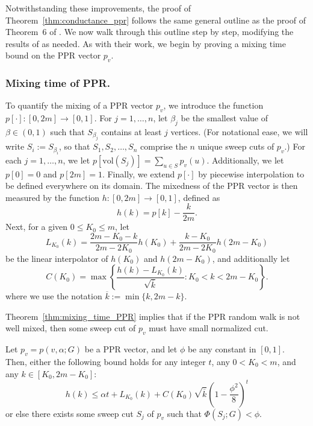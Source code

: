 \documentclass[11pt,twoside]{article}
\newcommand{\set}[1]{\left\{#1\right\}}
\newcommand{\vol}{\mathrm{vol}}
\newcommand{\1}{\mathbbm{1}}
\begin{document}
Notwithstanding these improvements, the proof of Theorem~\ref{thm:conductance_ppr} follows the same general outline as the proof of Theorem~6 of \citet{andersen2006}. We now walk through this outline step by step, modifying the results of \citet{andersen2006} as needed. As with their work, we begin by proving a mixing time bound on the PPR vector $p_v$.

\subsubsection{Mixing time of PPR.}

To quantify the mixing of a PPR vector $p_v$, we introduce the function $p[\cdot]: [0,2m] \to [0,1]$. For $j = 1,\ldots,n$, let $\beta_j$ be the smallest value of $\beta \in (0,1)$ such that $S_{\beta_j}$ contains at least $j$ vertices. (For notational ease, we will write $S_{i} := S_{\beta_i}$, so that $S_1,S_2,\ldots,S_n$ comprise the $n$ unique sweep cuts of $p_v$.)
For each $j = 1,\ldots,n$, we let $p[\vol(S_j)] =  \sum_{u \in S} p_v(u)$. Additionally, we let $p[0] = 0$ and $p[2m] = 1$. Finally, we extend $p[\cdot]$  by piecewise interpolation to be defined everywhere on its domain. The mixedness of the PPR vector is then measured by the function $h:[0,2m] \to [0,1]$, defined as 
\begin{equation*}
h(k) = p[k] - \frac{k}{2m}.
\end{equation*}
Next, for a given $0 \leq K_0 \leq m$, let 
\begin{equation*}
L_{K_0}(k) = \frac{2m - K_0 - k}{2m - 2K_0}h(K_0) + \frac{k - K_0}{2m - 2K_0}h(2m - K_0)
\end{equation*}
be the linear interpolator of $h(K_0)$ and $h(2m - K_0)$, and additionally let
\begin{equation*}
C(K_0) = \max\set{\frac{h(k) - L_{K_0}(k)}{\sqrt{\overline{k}}}: K_0 < k < 2m - K_0}.
\end{equation*}
where we use the notation $\overline{k} := \min\{k, 2m - k\}$.

Theorem~\ref{thm:mixing_time_PPR} implies that if the PPR random walk is not well mixed, then some sweep cut of $p_v$ must have small normalized cut.
\begin{theorem}
	\label{thm:mixing_time_PPR}
	Let $p_v = p(v,\alpha;G)$ be a PPR vector, and let $\phi$ be any constant in $[0,1]$. Then, either the following bound holds for any integer $t$, any $0 < K_0 < m$, and any $k \in [K_0,2m - K_0]$:
	\begin{equation}
	\label{eqn:mixing_time_PPR}
	h(k) \leq \alpha t + L_{K_0}(k) + C(K_0)\sqrt{\overline{k}}\left(1 - \frac{\phi^2}{8}\right)^t
	\end{equation}
	or else there exists some sweep cut $S_j$ of $p_v$ such that $\Phi(S_j;G) < \phi$.
\end{theorem}
\end{document}
